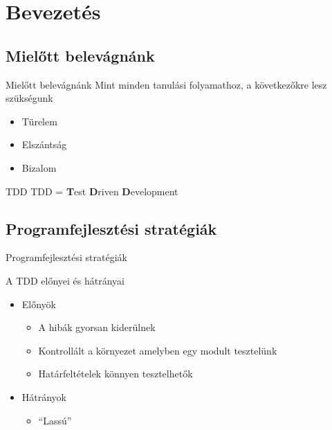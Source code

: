 \section{Bevezetés}

\subsection{Mielőtt belevágnánk}
\begin{frame}{Mielőtt belevágnánk}
  Mint minden tanulási folyamathoz, a következőkre lesz szükségunk
  \begin{itemize}[<+->]
  \item Türelem
  \item Elszántság
  \item Bizalom
  \end{itemize}
\end{frame}

\begin{frame}{TDD}
  TDD = \textbf{T}est \textbf{D}riven \textbf{D}evelopment
\end{frame}

\subsection{Programfejlesztési stratégiák}
\begin{frame}{Programfejlesztési stratégiák}

\end{frame}

\begin{frame}{A TDD előnyei és hátrányai}
  \begin{itemize}[<+->]
  \item Előnyök
    \begin{itemize}
    \item A hibák gyorsan kiderülnek
    \item Kontrollált a környezet amelyben egy modult tesztelünk
    \item Határfeltételek könnyen tesztelhetők
    \end{itemize}
  \item Hátrányok
    \begin{itemize}
    \item ``Lassú''
    \end{itemize}
  \end{itemize}
\end{frame}

